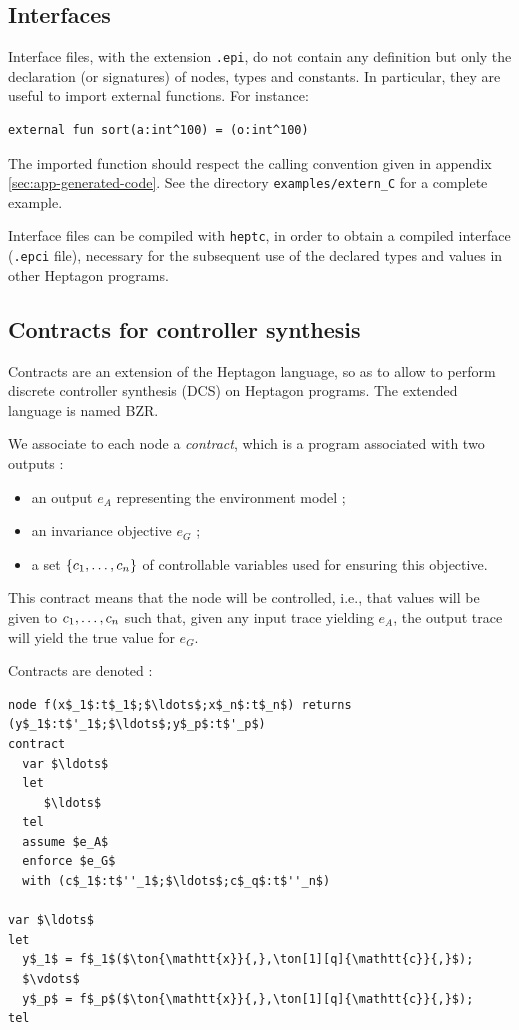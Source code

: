 \documentclass[a4paper]{article}
\begin{document}
\subsection{Interfaces}

Interface files, with the extension \texttt{.epi}, do not contain any definition but only the declaration (or signatures) of nodes, types and constants. In particular, they are useful to import external functions. For instance:
\begin{lstlisting}
external fun sort(a:int^100) = (o:int^100)
\end{lstlisting}
The imported function should respect the calling convention given in appendix \ref{sec:app-generated-code}. See the directory \texttt{examples/extern\_C} for a complete example.

Interface files can be compiled with \texttt{heptc}, in order to obtain a
compiled interface (\texttt{.epci} file), necessary for the subsequent use of
the declared types and values in other Heptagon programs.

\subsection{Contracts for controller synthesis}
\label{sec:extens-with-contr}

Contracts are an extension of the Heptagon language, so as to allow to perform
discrete controller synthesis (DCS) on Heptagon programs. The extended language is
named BZR.

We associate to each node a \emph{contract}, which is a program associated with
two outputs :
\begin{itemize}
\item an output $e_A$ representing the environment model ;
\item an invariance objective $e_G$ ;
\item a set $\set{\ton{c}{,}}$ of controllable variables used for ensuring this objective.
\end{itemize}

This contract means that the node will be controlled, i.e., that values will be
given to $\ton{c}{,}$ such that, given any input trace yielding $e_A$, the
output trace will yield the true value for $e_G$.

Contracts are denoted :
\begin{lstlisting}
node f(x$_1$:t$_1$;$\ldots$;x$_n$:t$_n$) returns (y$_1$:t$'_1$;$\ldots$;y$_p$:t$'_p$)
contract
  var $\ldots$
  let
     $\ldots$
  tel
  assume $e_A$
  enforce $e_G$
  with (c$_1$:t$''_1$;$\ldots$;c$_q$:t$''_n$)

var $\ldots$
let
  y$_1$ = f$_1$($\ton{\mathtt{x}}{,},\ton[1][q]{\mathtt{c}}{,}$); 
  $\vdots$
  y$_p$ = f$_p$($\ton{\mathtt{x}}{,},\ton[1][q]{\mathtt{c}}{,}$); 
tel
\end{lstlisting}
\end{document}
